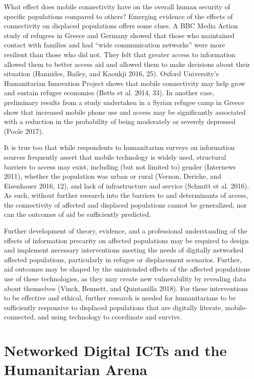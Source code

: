 What effect does mobile connectivity have on the overall human security
of specific populations compared to others? Emerging evidence of the
effects of connectivity on displaced populations offers some clues. A
BBC Media Action study of refugees in Greece and Germany showed that
those who maintained contact with families and had ``wide communication
networks'' were more resilient than those who did not. They felt that
greater access to information allowed them to better access aid and
allowed them to make decisions about their situation (Hannides, Bailey,
and Kaoukji 2016, 25). Oxford University's Humanitarian Innovation
Project shows that mobile connectivity may help grow and sustain refugee
economies (Betts et al. 2014, 33). In another case, preliminary results
from a study undertaken in a Syrian refugee camp in Greece show that
increased mobile phone use and access may be significantly associated
with a reduction in the probability of being moderately or severely
depressed (Poole 2017).

It is true too that while respondents to humanitarian surveys on
information sources frequently assert that mobile technology is widely
used, structural barriers to access may exist, including (but not
limited to) gender (Internews 2011), whether the population was urban or
rural (Vernon, Deriche, and Eisenhauer 2016, 12), and lack of
infrastructure and service (Schmitt et al. 2016). As such, without
further research into the barriers to and determinants of access, the
connectivity of affected and displaced populations cannot be
generalized, nor can the outcomes of aid be sufficiently predicted.

Further development of theory, evidence, and a professional
understanding of the effects of information precarity on affected
populations may be required to design and implement necessary
interventions meeting the needs of digitally networked affected
populations, particularly in refugee or displacement scenarios. Further,
aid outcomes may be shaped by the unintended effects of the affected
populations use of these technologies, as they may create new
vulnerability by revealing data about themselves (Vinck, Bennett, and
Quintanilla 2018). For these interventions to be effective and ethical,
further research is needed for humanitarians to be sufficiently
responsive to displaced populations that are digitally literate,
mobile-connected, and using technology to coordinate and survive.

\hypertarget{networked-digital-icts-and-the-humanitarian-arena}{%
\section{Networked Digital ICTs and the Humanitarian
Arena}\label{networked-digital-icts-and-the-humanitarian-arena}}

